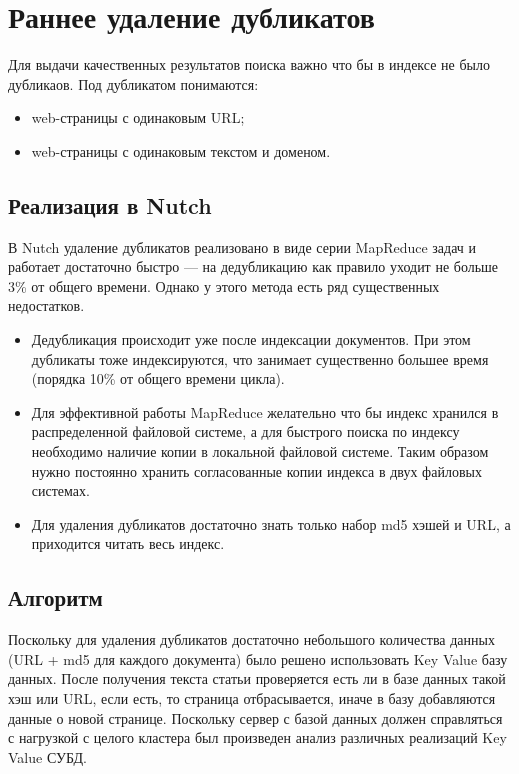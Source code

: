 \section{Раннее удаление дубликатов}
Для выдачи качественных результатов поиска важно что бы в индексе не было дубликаов. Под дубликатом понимаются:
\begin{itemize}
 \item web-страницы с одинаковым URL;
 \item web-страницы с одинаковым текстом и доменом. 
\end{itemize}
\subsection{Реализация в Nutch}
В Nutch удаление дубликатов реализовано в виде серии MapReduce задач и работает достаточно быстро --- на дедубликацию как правило уходит не больше 3\% от общего времени. Однако у этого метода есть ряд существенных недостатков.
\begin{itemize}
 \item Дедубликация происходит уже после индексации документов. При этом дубликаты тоже индексируются, что занимает существенно большее время (порядка 10\% от общего времени цикла).
 \item Для эффективной работы MapReduce желательно что бы индекс хранился в распределенной файловой системе, а для быстрого поиска по индексу необходимо наличие копии в локальной файловой системе. Таким образом  нужно постоянно хранить согласованные копии индекса в двух файловых системах.
 \item Для удаления дубликатов достаточно знать только набор md5 хэшей и URL, а приходится читать весь индекс.
\end{itemize}
\subsection{Алгоритм}
Поскольку для удаления дубликатов достаточно небольшого количества данных (URL + md5 для каждого документа) было решено использовать Key Value базу данных. После получения текста статьи проверяется есть ли в базе данных такой хэш или URL, если есть, то страница отбрасывается, иначе в базу добавляются данные о новой странице. Поскольку сервер с базой данных должен справляться с нагрузкой с целого кластера был произведен анализ различных реализаций Key Value СУБД.
